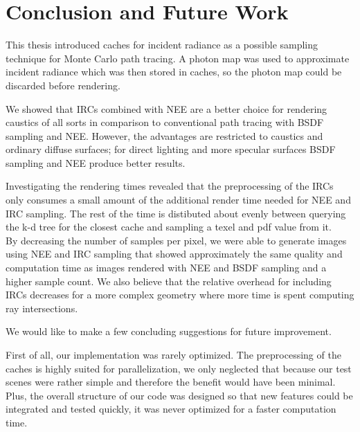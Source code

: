 \chapter{Conclusion and Future Work}
\label{chapter:Conclusion}

This thesis introduced caches for incident radiance as a possible sampling technique for Monte Carlo path tracing. A photon map was used to approximate incident radiance which was then stored in caches, so the photon map could be discarded before rendering. 

We showed that IRCs combined with NEE are a better choice for rendering caustics of all sorts in comparison to conventional path tracing with BSDF sampling and NEE. However, the advantages are restricted to caustics and ordinary diffuse surfaces; for direct lighting and more specular surfaces BSDF sampling and NEE produce better results.

Investigating the rendering times revealed that the preprocessing of the IRCs only consumes a small amount of the additional render time needed for NEE and IRC sampling. The rest of the time is distibuted about evenly between querying the k-d tree for the closest cache and sampling a texel and pdf value from it.\\
By decreasing the number of samples per pixel, we were able to generate images using NEE and IRC sampling that showed approximately the same quality and computation time as images rendered with NEE and BSDF sampling and a higher sample count. We also believe that the relative overhead for including IRCs decreases for a more complex geometry where more time is spent computing ray intersections.



\null
We would like to make a few concluding suggestions for future improvement.

First of all, our implementation was rarely optimized. The preprocessing of the caches is highly suited for parallelization, we only neglected that because our test scenes were rather simple and therefore the benefit would have been minimal. Plus, the overall structure of our code was designed so that new features could be integrated and tested quickly, it was never optimized for a faster computation time.

